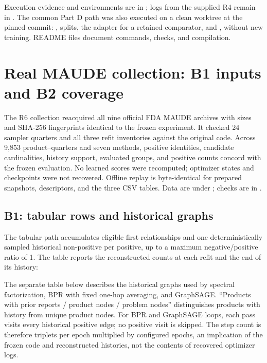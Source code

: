 Execution evidence and environments are in ; logs from the supplied R4 remain in . The common Part D path was also executed on a clean worktree at the pinned commit: , splits, the  adapter for a retained comparator, and , without new training. README files document commands, checks, and compilation.
\par{}
\section{Real MAUDE collection: B1 inputs and B2 coverage}
\label{supp:maudeB}
The R6 collection reacquired all nine official FDA MAUDE archives with sizes and SHA-256 fingerprints identical to the frozen experiment. It checked 24 sampler quarters and all three refit inventories against the original code. Across 9,853 product--quarters and seven methods, positive identities, candidate cardinalities, history support, evaluated groups, and positive counts concord with the frozen evaluation. No learned scores were recomputed; optimizer states and checkpoints were not recovered. Offline replay is byte-identical for prepared snapshots, descriptors, and the three CSV tables. Data are under ; checks are in .

\subsection{B1: tabular rows and historical graphs}
The tabular path accumulates eligible first relationships and one deterministically sampled historical non-positive per positive, up to a maximum negative/positive ratio of 1. The table reports the reconstructed counts at each refit and the end of its history:

\begin{table}[!htbp]\centering\small
\caption{B1, MAUDE tabular training rows at the three refits; counts from .}
\label{tab:maude-B1-tabular}

\end{table}

The separate table below describes the historical graphs used by spectral factorization, BPR with fixed one-hop averaging, and GraphSAGE. “Products with prior reports / product nodes / problem nodes” distinguishes products with history from unique product nodes. For BPR and GraphSAGE loops, each pass visits every historical positive edge; no positive visit is skipped. The step count is therefore triplets per epoch multiplied by configured epochs, an implication of the frozen code and reconstructed histories, not the contents of recovered optimizer logs.

